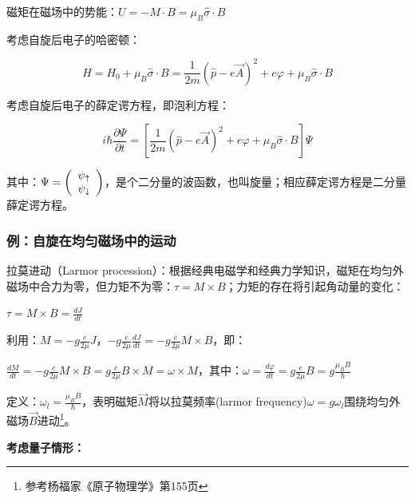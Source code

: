 磁矩在磁场中的势能：$U =  - M \cdot B = \mu _B \widehat\sigma  \cdot B$


考虑自旋后电子的哈密顿：

\begin{equation}\label{29-3-2}
H = H_0  + \mu _B \widehat\sigma  \cdot B = \frac{1}{{2m}}\left( {\widehat p - e\vec A} \right)^2  + e\varphi  + \mu _B \widehat\sigma  \cdot B
\end{equation}


考虑自旋后电子的薛定谔方程，即泡利方程：


\begin{equation}\label{29-3-3}
i\hbar \frac{{\partial \Psi }}{{\partial t}} = \left[ {\frac{1}{{2m}}\left( {\widehat p - e\vec A} \right)^2  + e\varphi  + \mu _B \widehat\sigma  \cdot B} \right]\Psi
\end{equation}


其中：$\Psi  = \left( {\begin{array}{*{20}c}
   {\psi _ \uparrow  }  \\
   {\psi _ \downarrow  }  \\
\end{array}} \right)$，是个二分量的波函数，也叫旋量；相应薛定谔方程是二分量薛定谔方程。


\subsubsection*{例：自旋在均匀磁场中的运动}

拉莫进动（Larmor procession）：根据经典电磁学和经典力学知识，磁矩在均匀外磁场中合力为零，但力矩不为零：$\tau  = M \times B$；力矩的存在将引起角动量的变化：

\begin{center}
$\tau  = M \times B = \frac{{dJ}}{{dt}}$
\end{center}

利用：$M =  - g\frac{e}{{2\mu }}J$，$ - g\frac{e}{{2\mu }}\frac{{dJ}}{{dt}} =  - g\frac{e}{{2\mu }}M \times B$，即：


$\frac{{dM}}{{dt}} =  - g\frac{e}{{2\mu }}M \times B =
g\frac{e}{{2\mu }}B \times M = \omega  \times M$，其中：$\omega =
\frac{{d\varphi }}{{dt}} = g\frac{e}{{2\mu }}B = g\frac{{\mu _B
B}}{\hbar }$

定义：$\omega _l  = \frac{{\mu _B B}}{\hbar }$，表明磁矩$\vec
M$将以拉莫频率(larmor frequency)$\omega = g \omega
_l$围绕均匀外磁场$\vec
B$进动\footnote{参考杨福家《原子物理学》第155页}。


\textbf{考虑量子情形：}

